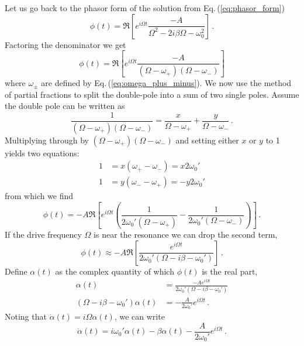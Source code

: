 \documentclass{article}
\begin{document}
Let us go back to the phasor form of the solution from Eq.\,(\ref{eq:phasor_form})
\begin{equation}
\phi(t) = \Re \left[ e^{i \Omega t} \frac{-A}{\Omega^2 - 2 i \beta \Omega - \omega_0^2} \right] \, .
\end{equation}
Factoring the denominator we get
\begin{equation}
\phi(t) = \Re \left[ e^{i \Omega t} \frac{-A}{(\Omega - \omega_+)(\Omega - \omega_-)} \right]
\end{equation}
where $\omega_{\pm}$ are defined by Eq.\,(\ref{eq:omega_plus_minus}).
We now use the method of partial fractions to split the double-pole into a sum of two single poles.
Assume the double pole can be written as
\begin{equation}
\frac{1}{(\Omega - \omega_+)(\Omega - \omega_-)}
= \frac{x}{\Omega - \omega_+} + \frac{y}{\Omega - \omega_-} \, .
\end{equation}
Multiplying through by $(\Omega - \omega_+)(\Omega - \omega_-)$ and setting either $x$ or $y$ to 1 yields two equations:
\begin{align}
1 &= x (\omega_+ - \omega_-) = x 2 \omega_0' \\
1 &= y (\omega_- - \omega_+) = -y 2 \omega_0'
\end{align}
from which we find
\begin{equation}
\phi(t) = -A \Re
\left[ e^{i \Omega t} \left(
\frac{1}{2 \omega_0' (\Omega - \omega_+)} -
\frac{1}{2 \omega_0' (\Omega - \omega_-)}
\right) \right] \, .
\end{equation}
If the drive frequency $\Omega$ is near the resonance we can drop the second term,
\begin{equation}
\phi(t) \approx -A \Re
\left[
\frac{e^{i \Omega t}}{2 \omega_0' (\Omega - i\beta - \omega_0')}
\right] \, .
\end{equation}
Define $\alpha(t)$ as the complex quantity of which $\phi(t)$ is the real part,
\begin{align}
\alpha(t) &= \frac{-A e^{i \Omega t}}{2 \omega_0'(\Omega - i \beta - \omega_0')} \\
(\Omega - i \beta - \omega_0') \alpha(t) &= - \frac{A}{2\omega_0'} e^{i \Omega t} \, .
\end{align}
Noting that $\dot{\alpha}(t) = i \Omega \alpha(t)$, we can write
\begin{equation}
\dot{\alpha}(t) = i \omega_0' \alpha(t) - \beta \alpha(t) - \frac{A}{2 \omega_0'} e^{i \Omega t} \, .
\end{equation}
\end{document}
